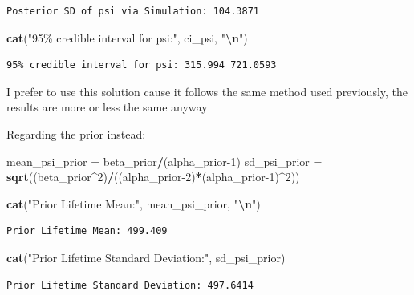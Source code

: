 \documentclass[
]{article}
\newenvironment{Shaded}{\begin{snugshade}}{\end{snugshade}}
\newcommand{\DecValTok}[1]{\textcolor[rgb]{0.00,0.00,0.81}{#1}}
\newcommand{\FunctionTok}[1]{\textcolor[rgb]{0.13,0.29,0.53}{\textbf{#1}}}
\newcommand{\NormalTok}[1]{#1}
\newcommand{\OtherTok}[1]{\textcolor[rgb]{0.56,0.35,0.01}{#1}}
\newcommand{\SpecialCharTok}[1]{\textcolor[rgb]{0.81,0.36,0.00}{\textbf{#1}}}
\newcommand{\StringTok}[1]{\textcolor[rgb]{0.31,0.60,0.02}{#1}}
\begin{document}
\begin{verbatim}
Posterior SD of psi via Simulation: 104.3871 
\end{verbatim}

\begin{Shaded}
\begin{Highlighting}[]
\FunctionTok{cat}\NormalTok{(}\StringTok{"95\% credible interval for psi:"}\NormalTok{, ci\_psi, }\StringTok{"}\SpecialCharTok{\textbackslash{}n}\StringTok{"}\NormalTok{)}
\end{Highlighting}
\end{Shaded}

\begin{verbatim}
95% credible interval for psi: 315.994 721.0593 
\end{verbatim}

I prefer to use this solution cause it follows the same method used
previously, the results are more or less the same anyway

Regarding the prior instead:

\begin{Shaded}
\begin{Highlighting}[]
\NormalTok{mean\_psi\_prior }\OtherTok{=}\NormalTok{ beta\_prior}\SpecialCharTok{/}\NormalTok{(alpha\_prior}\DecValTok{{-}1}\NormalTok{)}
\NormalTok{sd\_psi\_prior }\OtherTok{=} \FunctionTok{sqrt}\NormalTok{((beta\_prior}\SpecialCharTok{\^{}}\DecValTok{2}\NormalTok{)}\SpecialCharTok{/}\NormalTok{((alpha\_prior}\DecValTok{{-}2}\NormalTok{)}\SpecialCharTok{*}\NormalTok{(alpha\_prior}\DecValTok{{-}1}\NormalTok{)}\SpecialCharTok{\^{}}\DecValTok{2}\NormalTok{))}

\FunctionTok{cat}\NormalTok{(}\StringTok{"Prior Lifetime Mean:"}\NormalTok{, mean\_psi\_prior, }\StringTok{"}\SpecialCharTok{\textbackslash{}n}\StringTok{"}\NormalTok{)}
\end{Highlighting}
\end{Shaded}

\begin{verbatim}
Prior Lifetime Mean: 499.409 
\end{verbatim}

\begin{Shaded}
\begin{Highlighting}[]
\FunctionTok{cat}\NormalTok{(}\StringTok{"Prior Lifetime Standard Deviation:"}\NormalTok{, sd\_psi\_prior)}
\end{Highlighting}
\end{Shaded}

\begin{verbatim}
Prior Lifetime Standard Deviation: 497.6414
\end{verbatim}
\end{document}
